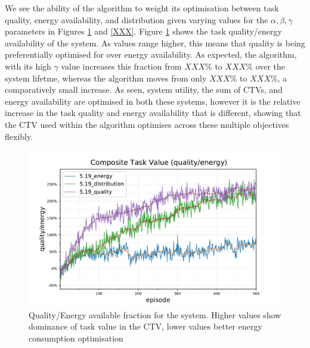 We see the ability of the algorithm to weight its optimisation between task quality, energy availability, and distribution given varying values for the $\alpha, \beta, \gamma$ parameters in Figures \ref{fig:5.19_ctv-quality-energy} and  \ref{XXX}. Figure \ref{fig:5.19_ctv-quality-energy} shows the task quality/energy availability of the system. As values range higher, this means that quality is being preferentially optimised for over energy availability. As expected, the \algorithmQuality{}{} algorithm, with its high $\gamma$ value increases this fraction from $XXX\%$ to $XXX\%$ over the system lifetme, whereas the \algorithmEnergy{}{} algorithm moves from only $XXX\%$ to $XXX\%$, a comparatively small increase. As seen, system utility, the sum of CTVs, and energy availability are optimised in both these systems, however it is the relative increase in the task quality and energy availability that is different, showing that the CTV used within the algorithm optimises across these multiple objectives flexibly. 


\begin{figure}[ht]
	\centering
	\includegraphics[width=0.8\linewidth]{5.19_ctv-quality-energy}
	\captionsetup{labelfont=bf,singlelinecheck=on}
	\caption{Quality/Energy available fraction for the \simulationExtended{}{} system. Higher values show dominance of task value in the CTV, lower values better energy consumption optimisation}
	\label{fig:5.19_ctv-quality-energy}
\end{figure}


